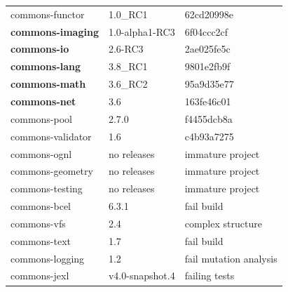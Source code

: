 \documentclass[sigconf,review,anonymous]{acmart}
\begin{document}
\begin{table}[t]
{\begin{tabular}{|l|l|l| }
    commons-functor       & 1.0\_RC1       		& 62cd20998e\\ %
    \textbf{commons-imaging}       & 1.0-alpha1-RC3 & 6f04ccc2cf\\ %
    \textbf{commons-io}            & 2.6-RC3        & 2ae025fe5c\\ %
    \textbf{commons-lang}          & 3.8\_RC1   	& 9801e2fb9f\\ %
    \textbf{commons-math}          & 3.6\_RC2   & 95a9d35e77\\ %
    \textbf{commons-net}           & 3.6            	& 163fe46c01\\ %
    commons-pool          & 2.7.0          		& f4455dcb8a\\ %
    commons-validator     & 1.6            		& c4b93a7275\\ %
    \hline
    \hline 
    commons-ognl          & no releases    & immature project \\
    commons-geometry      & no releases    & immature project \\
    commons-testing       & no releases    & immature project \\
    \hline
    commons-bcel          & 6.3.1           & fail build \\
    commons-vfs           & 2.4             & complex structure \\ %
    commons-text          & 1.7             & fail build \\ %
    commons-logging       & 1.2             & fail mutation analysis \\ %
    commons-jexl          & v4.0-snapshot.4 & failing tests \\

\end{tabular}}
\end{table}
\end{document}
